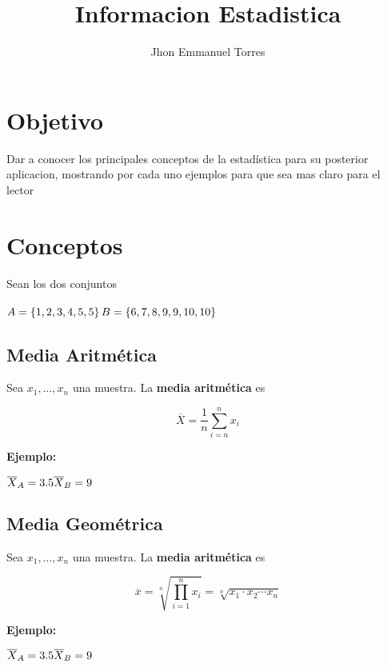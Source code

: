 \documentclass[10pt,a4paper]{article}
\title{Informacion Estadistica}
\date{}
\author{Jhon Emmanuel Torres}
\begin{document}
\maketitle
\section{Objetivo}
Dar a conocer los principales conceptos de la estadística para su posterior aplicacion, mostrando por cada uno ejemplos para que sea mas claro para el lector

\section{Conceptos}
Sean los dos conjuntos\\\\
$
A = \left\lbrace  1, 2, 3, 4, 5, 5 \right\rbrace \\
B = \left\lbrace  6, 7, 8, 9, 9, 10, 10 \right\rbrace  
$

\subsection{Media Aritmética}
Sea $x_{1}, \ldots,x_{n}$ una muestra. La \textbf{media aritmética} es

$$ \overline{X} = \dfrac{1}{n} \sum_{i = n}^{n}x_{i} $$
\begin{flushleft}
\textbf{Ejemplo:}
\end{flushleft}
$
\overline{X}_{A} = 3.5\\
\overline{X}_{B} = 9
$

\subsection{Media Geométrica}

Sea $x_{1}, \ldots,x_{n}$ una muestra. La \textbf{media aritmética} es

$$ \overline{x} = \sqrt[n]{\prod_{i = 1}^{n} x_i } = \sqrt[n]{x_1\cdot x_2 \cdots x_n }
 $$

\begin{flushleft}
	\textbf{Ejemplo:}
\end{flushleft}
$
\overline{X}_{A} = 3.5\\
\overline{X}_{B} = 9
$
\end{document}
